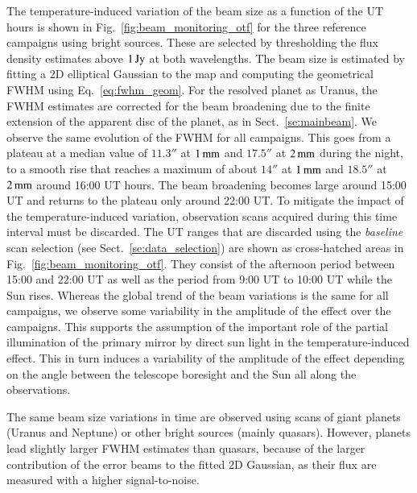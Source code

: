 The temperature-induced variation of the beam size as a function of
the UT hours is shown in Fig.~\ref{fig:beam_monitoring_otf} for the
three reference campaigns using bright sources. These are
selected by thresholding the flux density estimates above $1\,\rm{Jy}$
at both wavelengths. The beam size is estimated by fitting a 2D
elliptical Gaussian to the map {\lp and computing the geometrical FWHM
using Eq.~\ref{eq:fwhm_geom}.} For the resolved planet as Uranus, the
FWHM estimates are corrected for the beam broadening due to the finite
extension of the apparent disc of the planet, as in
Sect.~\ref{se:mainbeam}.
We observe the same evolution of
the FWHM for all campaigns. 
This goes from a plateau at a median value of $11.3''$ at $1\,\rm{mm}$
and $17.5''$ at $2\,\rm{mm}$ during the night, to a smooth rise that
reaches a maximum of about $14''$ at $1\,\rm{mm}$ and $18.5''$ at
$2\,\rm{mm}$ around 16:00 UT hours. The beam broadening becomes large
around 15:00 UT and returns to the plateau only around 22:00 UT.
To mitigate the impact of the temperature-induced variation,
observation scans acquired during this time interval must be
discarded. The UT ranges that are discarded
using the \emph{baseline} scan selection (see
Sect.~\ref{se:data_selection}) are shown as cross-hatched areas in
Fig.~\ref{fig:beam_monitoring_otf}.
They consist of the afternoon
period between 15:00 and 22:00 UT %
as well as the period from 9:00 UT to 10:00 UT while the Sun
rises. 
{\lp Whereas the global trend of the beam variations is the
same for all campaigns, we observe some variability in the amplitude
of the effect over the campaigns. This supports the assumption of the
important role of the partial illumination of the primary mirror by
direct sun light in the temperature-induced effect. This in turn
induces a variability of the amplitude of the effect depending on the
angle between the telescope boresight %
and the Sun all along the
observations.}

The same beam size variations in time are observed using scans of giant planets
(Uranus and Neptune) or other bright
sources (mainly quasars). However, planets lead slightly larger FWHM
estimates than quasars, because of
the larger contribution of the error beams to the fitted 2D Gaussian,
as their flux are measured with a higher signal-to-noise.

